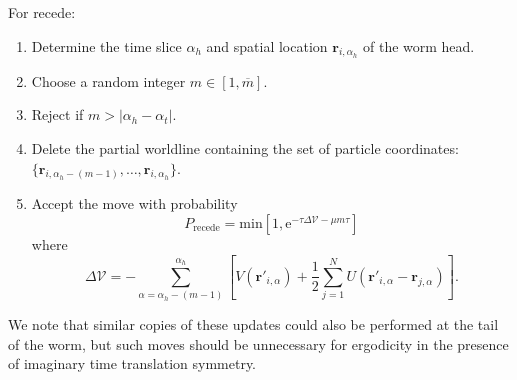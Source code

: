 \documentclass[prb,10pt,aps,floatfix,notitlepage]{revtex4-1}
\renewcommand{\vec}[1]{\boldsymbol{#1}}
\newcommand{\e}[1]{\mathrm{e}^{#1}}
\begin{document}
\noindent
For recede:
\begin{enumerate}
    \item Determine the time slice $\alpha_h$ and spatial location
        $\vec{r}_{i,\alpha_h}$ of the worm head.
    \item Choose a random integer $m \in [1,\overline{m}]$.
    \item Reject if $m > |\alpha_h-\alpha_t|$.
    \item Delete the partial worldline containing the set of particle coordinates: 
        $\{\vec{r}_{i,\alpha_h-(m-1)},\ldots, \vec{r}_{i,\alpha_h}\}$.
\item Accept the move with probability
\begin{equation}
    P_{\text{recede}} = \mathrm{min} \left[1,
    \e{-\tau \Delta \mathcal{V} - \mu m \tau} \right]
\end{equation}
%
where
%
\begin{equation}
    \Delta\mathcal{V} = -\sum_{\alpha=\alpha_h-(m-1)}^{\alpha_h} \left[ 
        V(\vec{r}'_{i,\alpha}) + \frac{1}{2}\sum_{j=1}^N
        U(\vec{r}'_{i,\alpha}-\vec{r}_{j,\alpha}) \right].
\end{equation}
%
\end{enumerate}
We note that similar copies of these updates could also be performed at the
tail of the worm, but such moves should be unnecessary for ergodicity in the presence of
imaginary time translation symmetry.
\end{document}
